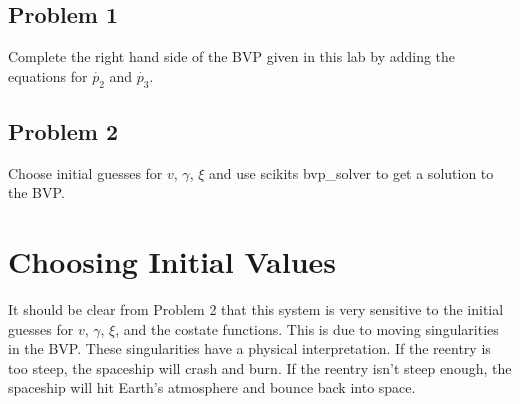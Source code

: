 \documentclass{article}
\begin{document}
\subsection*{Problem 1}
Complete the right hand side of the BVP given in this lab by adding the equations for $\dot{p_2}$ and $\dot{p_3}$.

\subsection*{Problem 2}
Choose initial guesses for $v$, $\gamma$, $\xi$ and use scikits bvp\_solver to get a solution to the BVP.

\section*{Choosing Initial Values}
It should be clear from Problem 2 that this system is very sensitive to the initial guesses for $v$, $\gamma$, $\xi$, and the costate functions. This is due to moving singularities in the BVP. These singularities have a physical interpretation. If the reentry is too steep, the spaceship will crash and burn. If the reentry isn't steep enough, the spaceship will hit Earth's atmosphere and bounce back into space.
\end{document}
